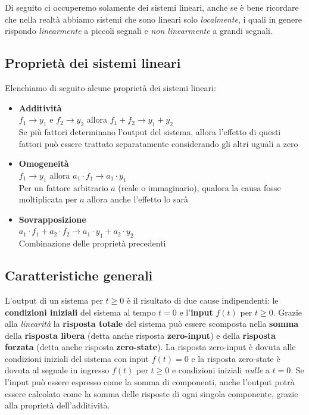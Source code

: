 \documentclass[a4paper, titlepage, oneside]{scrbook}
\begin{document}
Di seguito ci occuperemo solamente dei sistemi lineari, anche se è bene ricordare che nella realtà abbiamo sistemi che sono lineari solo \textit{localmente}, i quali in genere rispondo \textit{linearmente} a piccoli segnali e \textit{non linearmente} a grandi segnali.

\subsection{Proprietà dei sistemi lineari}
Elenchiamo di seguito alcune proprietà dei sistemi lineari:
\begin{itemize}
	\item \textbf{Additività}\\
	$f_{1} \rightarrow y_{1}$ e $f_{2} \rightarrow y_{2}$ allora $f_{1} +f_{2} \rightarrow y_{1}+y_{2}$\\
	Se più fattori determinano l'output del sistema, allora l'effetto di questi fattori può essere trattato separatamente considerando gli altri uguali a zero
	\item \textbf{Omogeneità}\\
	$f_{1} \rightarrow y_{1}$ allora $a_{1} \cdot f_{1}\rightarrow a_{1}\cdot y_{1}$\\
	Per un fattore arbitrario $a$ (reale o immaginario), qualora la causa fosse moltiplicata per $a$ allora anche l'effetto lo sarà
	\item \textbf{Sovrapposizione}\\
	$a_{1} \cdot f_{1} + a_{2}\cdot f_{2} \rightarrow a_{1}\cdot y_{1}+a_{2}\cdot y_{2}$\\
	Combinazione delle proprietà precedenti
\end{itemize}

\subsection{Caratteristiche generali}
L'output di un sistema per $t\geq0$ è il risultato di due cause indipendenti: le \textbf{condizioni iniziali} del sistema al tempo $t=0$ e l'\textbf{input} $f(t)$ per $t\geq0$.
Grazie alla \textit{linearità} la \textbf{risposta totale} del sistema può essere scomposta nella \textbf{somma} della \textbf{risposta libera} (detta anche risposta \textbf{zero-input}) e della \textbf{risposta forzata} (detta anche risposta \textbf{zero-state}).
La risposta zero-input è dovuta alle condizioni iniziali del sistema con input $f(t)=0$ e la risposta zero-state è dovuta al segnale in ingresso
$f(t)$ per $t\geq 0$ e condizioni iniziali \textit{nulle} a $t=0$.
Se l'input può essere espresso come la somma di componenti, anche l'output potrà essere calcolato come la somma delle risposte di ogni singola componente, grazie
alla proprietà dell'additività.
\end{document}
